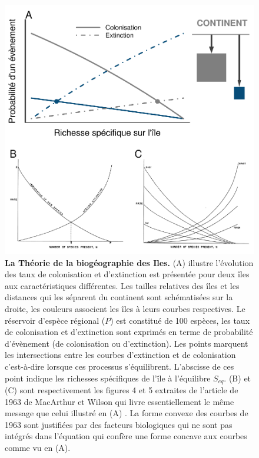 \begin{figure}[htbp]
\centering
\includegraphics{fig/fig1.pdf}
\caption{\textbf{La Théorie de la biogéographie des Iles.} (A) illustre
l'évolution des taux de colonisation et d'extinction est présentée pour
deux îles aux caractéristiques différentes. Les tailles relatives des
îles et les distances qui les séparent du continent sont schématisées
sur la droite, les couleurs associent les îles à leurs courbes
respectives. Le réservoir d'espèce régional (\(P\)) est constitué de 100
espèces, les taux de colonisation et d'extinction sont exprimés en terme
de probabilité d'évènement (de colonisation ou d'extinction). Les points
marquent les intersections entre les courbes d'extinction et de
colonisation c'est-à-dire lorsque ces processus s'équilibrent.
L'abscisse de ces point indique les richesses spécifiques de l'île à
l'équilibre \(S_{eq}\). (B) et (C) sont respectivement les figures 4 et
5 extraites de l'article de 1963 de MacArthur et Wilson qui livre
essentiellement le même message que celui illustré en (A)
\citep{MacArthur1963}. La forme convexe des courbes de 1963 sont
justifiées par des facteurs biologiques qui ne sont pas intégrés dans
l'équation \label{eqMW} qui confère une forme concave aux courbes comme
vu en (A).\label{fig:figMW}}
\end{figure}

